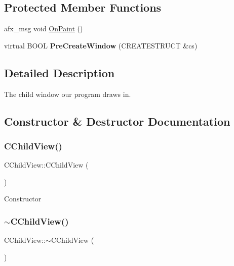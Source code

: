 \subsection*{Protected Member Functions}
\begin{DoxyCompactItemize}
\item 
afx\+\_\+msg void \mbox{\hyperlink{class_c_child_view_a8ea6d42631a4f9f446923ff864b239ab}{On\+Paint}} ()
\item 
\mbox{\label{class_c_child_view_a072cbcba60255377ac9d82aed9a14ce8}} 
virtual B\+O\+OL {\bfseries Pre\+Create\+Window} (C\+R\+E\+A\+T\+E\+S\+T\+R\+U\+CT \&cs)
\end{DoxyCompactItemize}


\subsection{Detailed Description}
The child window our program draws in. 

\subsection{Constructor \& Destructor Documentation}
\mbox{\label{class_c_child_view_aff5af7c162c10755edbe58f260ded6d4}} 
\subsubsection{\texorpdfstring{C\+Child\+View()}{CChildView()}}
{\footnotesize\ttfamily C\+Child\+View\+::\+C\+Child\+View (\begin{DoxyParamCaption}{ }\end{DoxyParamCaption})}

Constructor \mbox{\label{class_c_child_view_a5b033b5e0a130950719a173b86418698}} 
\subsubsection{\texorpdfstring{$\sim$\+C\+Child\+View()}{~CChildView()}}
{\footnotesize\ttfamily C\+Child\+View\+::$\sim$\+C\+Child\+View (\begin{DoxyParamCaption}{ }\end{DoxyParamCaption})\hspace{0.3cm}{\ttfamily [virtual]}}

